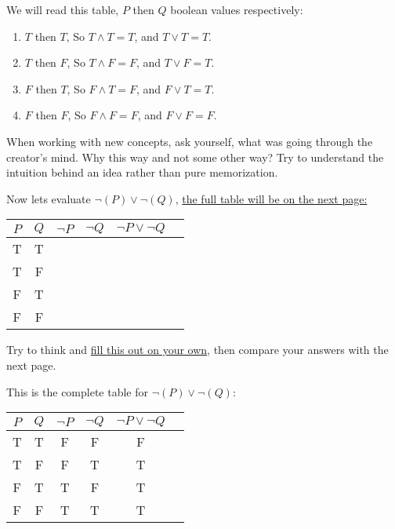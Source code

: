 \noindent
We will read this table, $P$ then $Q$ boolean values respectively:
\begin{enumerate}
    \item $T$ then $T$, So $T\land T = T$, and $T\lor T = T$.
    \item $T$ then $F$, So $T\land F = F$, and $T\lor F = T$.
    \item $F$ then $T$, So $F\land T = F$, and $F\lor T = T$.
    \item $F$ then $F$, So $F\land F = F$, and $F\lor F = F$.
\end{enumerate}

\begin{Tip}
    When working with new concepts, ask yourself, what was going
    through the creator's mind. Why this way and not some other way? Try
    to understand the intuition behind an idea rather than pure memorization.\\
\end{Tip}

\noindent
Now lets evaluate $\neg(P) \lor \neg(Q)$, \underline{the full table will be on the next page:}\\

\begin{center}
    \begin{tabular}{|c|c|c|c|c|c|}
        \hline
        \rowcolor{OliveGreen!10}
        $P$ & $Q$ & $\neg P$ & $\neg Q$ & $\neg P \lor \neg Q$ \\
        \hline
        T   & T   &          &          &                      \\
        T   & F   &          &          &                      \\
        F   & T   &          &          &                      \\
        F   & F   &          &          &                      \\
        \hline
    \end{tabular}
\end{center}

\noindent
Try to think and \underline{fill this out on your own}, then compare your answers with the next page.\\

\newpage

\noindent
This is the complete table for $\neg(P) \lor \neg(Q)$:
\begin{center}
    \begin{tabular}{|c|c|c|c|c|c|}
        \hline
        \rowcolor{OliveGreen!10}
        $P$ & $Q$ & $\neg P$ & $\neg Q$ & $\neg P \lor \neg Q$ \\
        \hline
        T   & T   & F        & F        & F                    \\
        T   & F   & F        & T        & T                    \\
        F   & T   & T        & F        & T                    \\
        F   & F   & T        & T        & T                    \\
        \hline
    \end{tabular}
\end{center}

